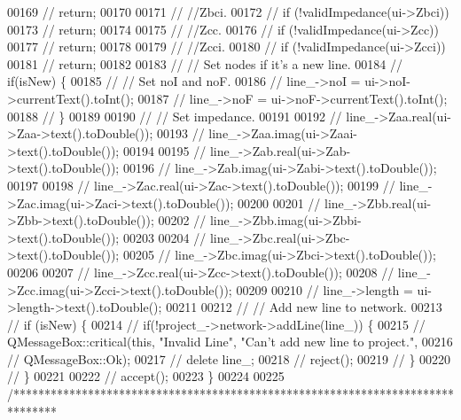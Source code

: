 \begin{DoxyCode}
00169 \textcolor{comment}{//    return;}
00170 
00171 \textcolor{comment}{//  //Zbci.}
00172 \textcolor{comment}{//  if (!validImpedance(ui->Zbci))}
00173 \textcolor{comment}{//    return;}
00174 
00175 \textcolor{comment}{//  //Zcc.}
00176 \textcolor{comment}{//  if (!validImpedance(ui->Zcc))}
00177 \textcolor{comment}{//    return;}
00178 
00179 \textcolor{comment}{//  //Zcci.}
00180 \textcolor{comment}{//  if (!validImpedance(ui->Zcci))}
00181 \textcolor{comment}{//    return;}
00182 
00183 \textcolor{comment}{//  // Set nodes if it's a new line.}
00184 \textcolor{comment}{//  if(isNew) \{}
00185 \textcolor{comment}{//    // Set noI and noF.}
00186 \textcolor{comment}{//    line\_->noI = ui->noI->currentText().toInt();}
00187 \textcolor{comment}{//    line\_->noF = ui->noF->currentText().toInt();}
00188 \textcolor{comment}{//  \}}
00189 
00190 \textcolor{comment}{//  // Set impedance.}
00191 
00192 \textcolor{comment}{//  line\_->Zaa.real(ui->Zaa->text().toDouble());}
00193 \textcolor{comment}{//  line\_->Zaa.imag(ui->Zaai->text().toDouble());}
00194 
00195 \textcolor{comment}{//  line\_->Zab.real(ui->Zab->text().toDouble());}
00196 \textcolor{comment}{//  line\_->Zab.imag(ui->Zabi->text().toDouble());}
00197 
00198 \textcolor{comment}{//  line\_->Zac.real(ui->Zac->text().toDouble());}
00199 \textcolor{comment}{//  line\_->Zac.imag(ui->Zaci->text().toDouble());}
00200 
00201 \textcolor{comment}{//  line\_->Zbb.real(ui->Zbb->text().toDouble());}
00202 \textcolor{comment}{//  line\_->Zbb.imag(ui->Zbbi->text().toDouble());}
00203 
00204 \textcolor{comment}{//  line\_->Zbc.real(ui->Zbc->text().toDouble());}
00205 \textcolor{comment}{//  line\_->Zbc.imag(ui->Zbci->text().toDouble());}
00206 
00207 \textcolor{comment}{//  line\_->Zcc.real(ui->Zcc->text().toDouble());}
00208 \textcolor{comment}{//  line\_->Zcc.imag(ui->Zcci->text().toDouble());}
00209 
00210 \textcolor{comment}{//  line\_->length = ui->length->text().toDouble();}
00211 
00212 \textcolor{comment}{//  // Add new line to network.}
00213 \textcolor{comment}{//  if (isNew) \{}
00214 \textcolor{comment}{//    if(!project\_->network->addLine(line\_)) \{}
00215 \textcolor{comment}{//      QMessageBox::critical(this, "Invalid Line", "Can't add new line to project.",}
00216 \textcolor{comment}{//                            QMessageBox::Ok);}
00217 \textcolor{comment}{//      delete line\_;}
00218 \textcolor{comment}{//      reject();}
00219 \textcolor{comment}{//    \}}
00220 \textcolor{comment}{//  \}}
00221 
00222 \textcolor{comment}{//  accept();}
00223 \}
00224 
00225 \textcolor{comment}{/*******************************************************************************}

\end{DoxyCode}
